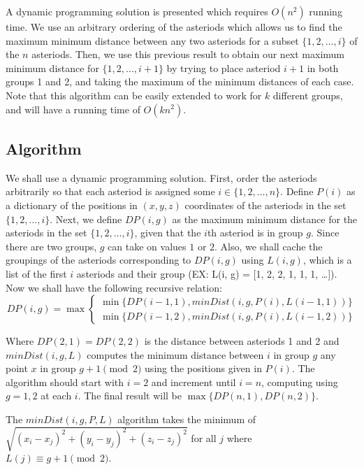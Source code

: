 \documentclass{6046}
\begin{document}
A dynamic programming solution is presented which requires $O(n^2)$ running time. We use an arbitrary ordering of the asteriods which allows us to find the maximum minimum distance between any two asteriods for a subset $\{1, 2, \ldots, i \}$ of the $n$ asteriods. Then, we use this previous result to obtain our next maximum minimum distance for $\{1, 2, \ldots, i+1 \}$ by trying to place asteriod $i + 1$ in both groups 1 and 2, and taking the maximum of the minimum distances of each case. Note that this algorithm can be easily extended to work for $k$ different groups, and will have a running time of $O(k n^2)$. 

\subsection*{Algorithm}

We shall use a dynamic programming solution. First, order the asteriods arbitrarily so that each asteriod is assigned some $i \in \{1, 2, \ldots, n\}$. Define $P(i)$ as a dictionary of the positions in $(x,y,z)$ coordinates of the asteriods in the set $\{1, 2, \ldots, i\}$. Next, we define $DP(i,g)$ as the maximum minimum distance for the asteriods in the set $\{1, 2, \ldots, i\}$, given that the $i$th asteriod is in group $g$. Since there are two groups, $g$ can take on values $1$ or $2$. Also, we shall cache the groupings of the asteriods corresponding to $DP(i,g)$ using $L(i,g)$, which is a list of the first $i$ asteriods and their group (EX: L(i, g) = [1, 2, 2, 1, 1, 1, \ldots ]). Now we shall have the following recursive relation:
\begin{equation}
DP(i,g) = \max \left\{ \begin{array}{ c} 
\min \{ DP(i-1, 1), minDist(i, g, P(i), L(i-1,1)) \} \\
\min \{ DP(i-1, 2), minDist(i, g, P(i), L(i-1, 2)) \} 
\end{array}
\right.
\end{equation}

Where $DP(2, 1) = DP(2, 2)$ is the distance between asteriods 1 and 2 and $minDist(i, g, L)$ computes the minimum distance between $i$ in group $g$ any point $x$ in group $g+1 \pmod{2}$ using the positions given in $P(i)$. The algorithm should start with $i=2$ and increment until $i = n$, computing using $g=1,2$ at each $i$. The final result will be $\max \{ DP(n, 1) ,DP(n, 2) \}$. 

The $minDist(i, g, P, L)$ algorithm takes the minimum of $\sqrt{ (x_i - x_j)^2 + (y_i - y_j)^2 + (z_i - z_j)^2 }$ for all $j$ where $L(j) \equiv g + 1 \pmod{2}$. 
\end{document}

